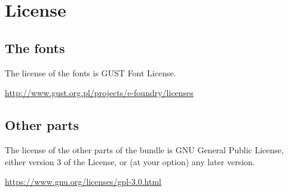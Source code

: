 \documentclass[paper=a4,11pt,english,parskip=half]{scrartcl}
\begin{document}
\section{License}
\label{sec:license}

\subsection{The fonts}
\label{sec:fonts}

The license of the fonts is GUST Font License.

\url{http://www.gust.org.pl/projects/e-foundry/licenses}

\subsection{Other parts}
\label{sec:other-parts}

The license of the other parts of the bundle is GNU General Public
License, either version 3 of the License, or (at your option) any
later version.

\url{https://www.gnu.org/licenses/gpl-3.0.html}
\end{document}
